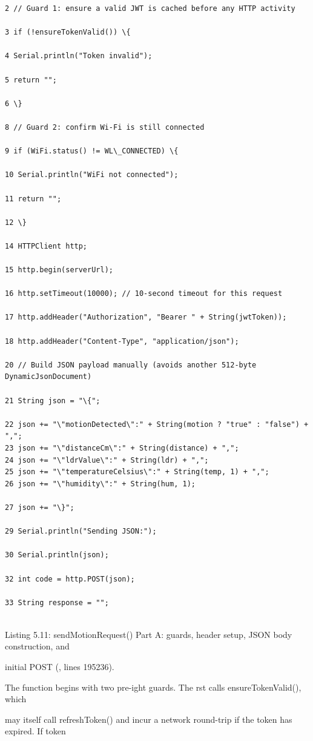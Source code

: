 \begin{listingbox}
	\begin{verbatim}
2 // Guard 1: ensure a valid JWT is cached before any HTTP activity

3 if (!ensureTokenValid()) \{

4 Serial.println("Token invalid");

5 return "";

6 \}

8 // Guard 2: confirm Wi-Fi is still connected

9 if (WiFi.status() != WL\_CONNECTED) \{

10 Serial.println("WiFi not connected");

11 return "";

12 \}

14 HTTPClient http;

15 http.begin(serverUrl);

16 http.setTimeout(10000); // 10-second timeout for this request

17 http.addHeader("Authorization", "Bearer " + String(jwtToken));

18 http.addHeader("Content-Type", "application/json");

20 // Build JSON payload manually (avoids another 512-byte DynamicJsonDocument)

21 String json = "\{";

22 json += "\"motionDetected\":" + String(motion ? "true" : "false") + ",";
23 json += "\"distanceCm\":" + String(distance) + ",";
24 json += "\"ldrValue\":" + String(ldr) + ",";
25 json += "\"temperatureCelsius\":" + String(temp, 1) + ",";
26 json += "\"humidity\":" + String(hum, 1);

27 json += "\}";

29 Serial.println("Sending JSON:");

30 Serial.println(json);

32 int code = http.POST(json);

33 String response = "";


\end{verbatim}
\end{listingbox}
Listing 5.11: sendMotionRequest() Part A: guards, header setup, JSON body construction, and

initial POST (, lines 195236).

The function begins with two pre-ight guards. The rst calls ensureTokenValid(), which

may itself call refreshToken() and incur a network round-trip if the token has expired. If token

